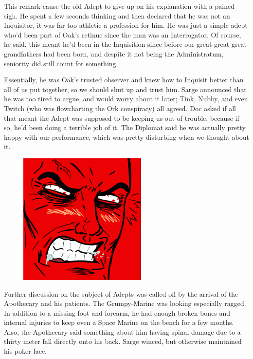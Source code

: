 This remark cause the old Adept to give up on his explanation with a pained sigh. 
He spent a few seconds thinking and then declared that he was not an Inquisitor, it was far too athletic a profession for him. 
He was just a simple adept who'd been part of Oak's retinue since the man was an Interrogator. 
Of course, he said, this meant he'd been in the Inquisition since before our great-great-great grandfathers had been born, and despite it not being the Administratum, seniority did still count for something.

Essentially, he was Oak's trusted observer and knew how to Inquisit better than all of us put together, so we should shut up and trust him. 
Sarge announced that he was too tired to argue, and would worry about it later; 
Tink, Nubby, and even Twitch (who was flowcharting the Ork conspiracy) all agreed. 
Doc asked if all that meant the Adept was supposed to be keeping us out of trouble, because if so, he'd been doing a terrible job of it. 
 The Diplomat said he was actually pretty happy with our performance, which was pretty disturbing when we thought about it.

\begin{figure}
	\begin{center}
		\includegraphics[width=\figwidth]{pics/16/63.png}
	\end{center}
\end{figure}
Further discussion on the subject of Adepts was called off by the arrival of the Apothecary and his patients. 
The Grumpy-Marine was looking especially ragged. 
In addition to a missing foot and forearm, he had enough broken bones and internal injuries to keep even a Space Marine on the bench for a few months. 
Also, the Apothecary said something about him having spinal damage due to a thirty meter fall directly onto his back. 
Sarge winced, but otherwise maintained his poker face.

